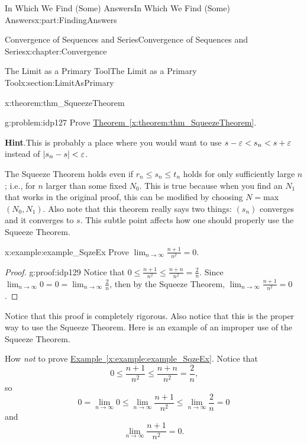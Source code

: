 \begin{partptx}{In Which We Find (Some) Answers}{}{In Which We Find (Some) Answers}{}{}{x:part:FindingAnswers}
\begin{chapterptx}{Convergence of Sequences and Series}{}{Convergence of Sequences and Series}{}{}{x:chapter:Convergence}
\begin{sectionptx}{The Limit as a Primary Tool}{}{The Limit as a Primary Tool}{}{}{x:section:LimitAsPrimary}
\begin{theorem}{}{}{x:theorem:thm_SqueezeTheorem}
			\end{theorem}
			\begin{problem}{}{g:problem:idp127}%
				Prove \hyperref[x:theorem:thm_SqueezeTheorem]{Theorem~{\xreffont\ref{x:theorem:thm_SqueezeTheorem}}}.%
				\par\smallskip%
				\noindent\textbf{\blocktitlefont Hint}.\hypertarget{g:hint:idp128}{}\quad{}This is probably a place where you would want to use \(s-\varepsilon< s_n< s+\varepsilon\) instead of \(|s_n-s|<
				\varepsilon\).%
			\end{problem}
			The Squeeze Theorem holds even if \(r_n\leq s_n\leq t_n\) holds for only sufficiently large \(n\); i.e., for \(n\) larger than some fixed \(N_0\). This is true because when you find an \(N_1\) that works in the original proof, this can be modified by choosing \(N=\)max\(\left(N_0,N_1\right)\). Also note that this theorem really says two things: \(\left(s_n\right)\) converges and it converges to \(s\). This subtle point affects how one should properly use the Squeeze Theorem.%
			\begin{example}{}{x:example:example_SqzeEx}%
				Prove \(\displaystyle\lim_{n\rightarrow\infty}\frac{n+1}{n^2}=0\).%
			\end{example}
			\begin{proof}{}{g:proof:idp129}
				Notice that \(0\leq\frac{n+1}{n^2}\leq\frac{n+n}{n^2}=\frac{2}{n}\). Since \(\displaystyle\lim_{n\rightarrow\infty}0=0=\lim_{n\rightarrow\infty}\frac{2}{n}\), then by the Squeeze Theorem, \(\displaystyle\lim_{n\rightarrow\infty}\frac{n+1}{n^2}=0\).%
			\end{proof}
			Notice that this proof is completely rigorous. Also notice that this is the proper way to use the Squeeze Theorem. Here is an example of an \textbraceleft{}improper\textbraceright{} use of the Squeeze Theorem.%
			\par
			How \emph{not} to prove \hyperref[x:example:example_SqzeEx]{Example~{\xreffont\ref{x:example:example_SqzeEx}}}. Notice that%
			\begin{equation*}
				0\leq\frac{n+1}{n^2}\leq\frac{n+n}{n^2}=\frac{2}{n}\text{,}
			\end{equation*}
			so%
			\begin{equation*}
				0=\lim_{n\rightarrow\infty}0 \leq \lim_{n\rightarrow\infty}\frac{n+1}{n^2}\leq\lim_{n\rightarrow\infty}\frac{2}{n}=0
			\end{equation*}
			and%
			\begin{equation*}
				\lim_{n\rightarrow\infty}\frac{n+1}{n^2}=0\text{.}
			\end{equation*}

\end{sectionptx}
\end{chapterptx}
\end{partptx}
